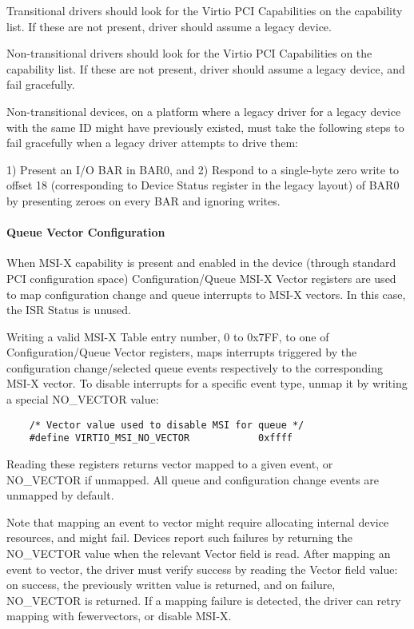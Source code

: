 Transitional drivers should look for the Virtio PCI
Capabilities on the capability list.
If these are not present, driver should assume a legacy device.

Non-transitional drivers should look for the Virtio PCI
Capabilities on the capability list.
If these are not present, driver should assume a legacy device,
and fail gracefully.

Non-transitional devices, on a platform where a legacy driver for
a legacy device with the same ID might have previously existed,
must take the following steps to fail gracefully when a legacy
driver attempts to drive them:

1) Present an I/O BAR in BAR0, and
2) Respond to a single-byte zero write to offset 18
   (corresponding to Device Status register in the legacy layout)
   of BAR0 by presenting zeroes on every BAR and ignoring writes.

\paragraph{Queue Vector Configuration}\label{sec:Virtio Transport Options / Virtio Over PCI Bus / PCI-specific Initialization And Device Operation / Device Initialization / Queue Vector Configuration}

When MSI-X capability is present and enabled in the device
(through standard PCI configuration space) Configuration/Queue
MSI-X Vector registers are used to map configuration change and queue
interrupts to MSI-X vectors. In this case, the ISR Status is unused.

Writing a valid MSI-X Table entry number, 0 to 0x7FF, to one of
Configuration/Queue Vector registers, maps interrupts triggered
by the configuration change/selected queue events respectively to
the corresponding MSI-X vector. To disable interrupts for a
specific event type, unmap it by writing a special NO_VECTOR
value:

\begin{lstlisting}
	/* Vector value used to disable MSI for queue */
	#define VIRTIO_MSI_NO_VECTOR            0xffff
\end{lstlisting}

Reading these registers returns vector mapped to a given event,
or NO_VECTOR if unmapped. All queue and configuration change
events are unmapped by default.

Note that mapping an event to vector might require allocating
internal device resources, and might fail. Devices report such
failures by returning the NO_VECTOR value when the relevant
Vector field is read. After mapping an event to vector, the
driver must verify success by reading the Vector field value: on
success, the previously written value is returned, and on
failure, NO_VECTOR is returned. If a mapping failure is detected,
the driver can retry mapping with fewervectors, or disable MSI-X.

